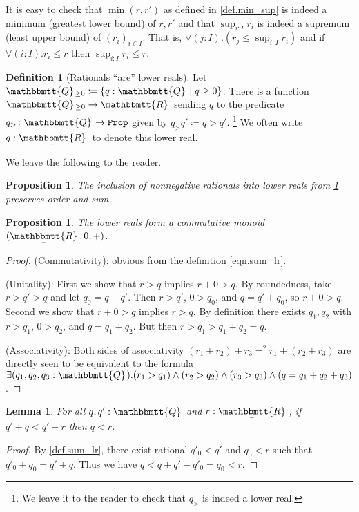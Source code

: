 \documentclass[11pt, oneside, article]{memoir}
\theoremstyle{plain}
\newtheorem{proposition}[theorem]{Proposition}
\newtheorem{lemma}[theorem]{Lemma}
\theoremstyle{definition}
\newtheorem{definition}[theorem]{Definition}
\theoremstyle{remark}
\newcommand{\const}[1]{\mathtt{#1}}
\newcommand{\ubar}[1]{\underaccent{\bar}{#1}}
\newcommand{\internal}[1]{\raisebox{-.03ex}{$\mathbbmtt{#1}$}}
\newcommand{\hs}{\hspace{1.1pt}}
\newcommand{\tqq}{\internal{Q}\hs}
\newcommand{\trr}{\internal{R}\hs}
\newcommand{\tlrr}{\ubar{\trr}\hs}
\newcommand{\prop}{\const{Prop}}
\begin{document}
It is easy to check that $\min(r,r')$ as defined in \cref{def.min_sup} is indeed a minimum (greatest lower bound) of $r,r'$ and that $\sup_{i:I}r_i$ is indeed a supremum (least upper bound) of $(r_i)_{i\in I}$. That is, $\forall(j:I).(r_j\leq\sup_{i:I}r_i)$ and if $\forall(i:I).r_i\leq r$ then $\sup_{i:I}r_i\leq r$.


\begin{definition}[Rationals ``are'' lower reals]\label{def.rationals_are_reals}
Let $\tqq_{\geq0}\coloneqq\{q:\tqq\mid q\geq0\}$. There is a function $\tqq_{\geq0}\to\tlrr$ sending $q$ to the predicate $q_>\colon\tqq\to\prop$ given by $q_>q'\coloneqq q>q'$.%
\footnote{We leave it to the reader to check that $q_>$ is indeed a lower real.}
 We often write $q:\tlrr$ to denote this lower real.
\end{definition}


We leave the following to the reader.
\begin{proposition}
The inclusion of nonnegative rationals into lower reals from \cref{def.rationals_are_reals} preserves order and sum.
\end{proposition}

\begin{proposition}
The lower reals form a commutative monoid $(\tlrr,0,+)$.
\end{proposition}
\begin{proof}
\noindent (Commutativity): obvious from the definition \eqref{eqn.sum_lr}.

\noindent (Unitality): First we show that $r>q$ implies $r+0>q$. By roundedness, take $r>q'>q$ and let $q_0=q-q'$. Then $r>q'$, $0>q_0$, and $q=q'+q_0$, so $r+0>q$. Second we show that $r+0>q$ implies $r>q$. By definition there exists $q_1,q_2$ with $r>q_1$, $0>q_2$, and $q=q_1+q_2$. But then $r>q_1>q_1+q_2=q$.

\noindent (Associativity): Both sides of associativity $(r_1+r_2)+r_3=^?r_1+(r_2+r_3)$ are directly seen to be equivalent to the formula $\exists(q_1,q_2,q_3:\tqq).(r_1>q_1)\wedge(r_2>q_2)\wedge(r_3>q_3)\wedge(q=q_1+q_2+q_3)$.
\end{proof}

\begin{lemma}\label{lemma.rational_cancellativity}
For all $q,q':\tqq$ and $r:\tlrr$, if $q'+q<q'+r$ then $q<r$.
\end{lemma}
\begin{proof}
By \cref{def.sum_lr}, there exist rational $q'_0<q'$ and $q_0<r$ such that $q'_0+q_0=q'+q$. Thus we have $q<q+q'-q'_0=q_0<r$.
\end{proof}
\end{document}
